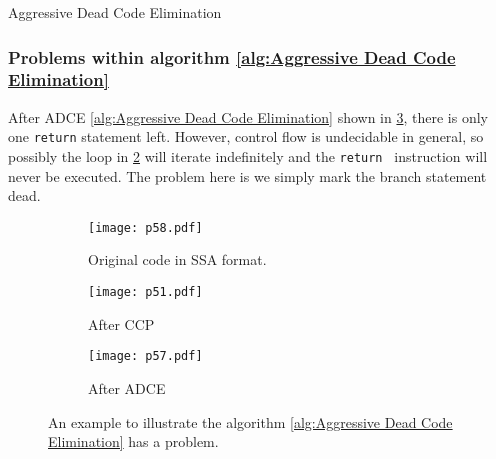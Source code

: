 \begin{algorithm}[H]
    \caption{Aggressive Dead Code Elimination}\label{alg:Aggressive Dead Code Elimination}
    \begin{algorithmic}
        \EndIf
        
    \EndWhile
    \EndFunction
    \end{algorithmic}
    \end{algorithm}


\subsubsection{Problems within algorithm \ref{alg:Aggressive Dead Code Elimination}}
After ADCE \ref{alg:Aggressive Dead Code Elimination} shown in \ref{fig:p57}, there is only one \texttt{return} statement left. 
However, control flow is undecidable in general, so possibly the loop in \ref{fig:pp51} will iterate indefinitely and the \texttt{return } instruction will never be executed.
The problem here is we simply mark the branch statement dead.
\begin{figure}[H]
    \centering
    \begin{subfigure}{0.3\textwidth}
    \centering
        \texttt{[image: p58.pdf]}
        \caption{Original code in SSA format. }
        \label{fig:p58}
    \end{subfigure}
    \begin{subfigure}{0.3\textwidth}
    \centering
        \texttt{[image: p51.pdf]}
        \caption{After CCP}
        \label{fig:pp51}
    \end{subfigure}
    \begin{subfigure}{0.3\textwidth}
        \centering
            \texttt{[image: p57.pdf]}
            \caption{After ADCE}
            \label{fig:p57}
        \end{subfigure}
    \caption{An example to illustrate the algorithm \ref{alg:Aggressive Dead Code Elimination} has a problem.}
       \label{fig:p51-58}
\end{figure}


